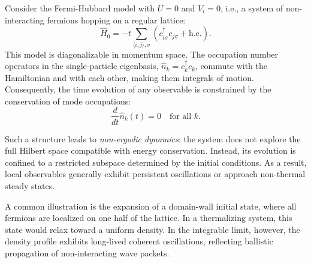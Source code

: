 Consider the Fermi-Hubbard model with $U = 0$ and $V_i = 0$, i.e., a system of non-interacting fermions hopping on a regular lattice:
\begin{equation*}
\hat{H}_0 = -t \sum_{\langle i,j \rangle, \sigma} \left( c_{i\sigma}^\dagger c_{j\sigma} + \text{h.c.} \right).
\label{eq:free_ham}
\end{equation*}
This model is diagonalizable in momentum space. The occupation number operators in the single-particle eigenbasis, $\hat{n}_k = c_k^\dagger c_k$, commute with the Hamiltonian and with each other, making them integrals of motion. Consequently, the time evolution of any observable is constrained by the conservation of mode occupations:
\begin{equation*}
\frac{d}{dt} \hat{n}_k(t) = 0 \quad \text{for all } k.
\end{equation*}

Such a structure leads to \textit{non-ergodic dynamics}: the system does not explore the full Hilbert space compatible with energy conservation. Instead, its evolution is confined to a restricted subspace determined by the initial conditions. As a result, local observables generally exhibit persistent oscillations or approach non-thermal steady states.

A common illustration is the expansion of a domain-wall initial state, where all fermions are localized on one half of the lattice. In a thermalizing system, this state would relax toward a uniform density. In the integrable limit, however, the density profile exhibits long-lived coherent oscillations, reflecting ballistic propagation of non-interacting wave packets.


